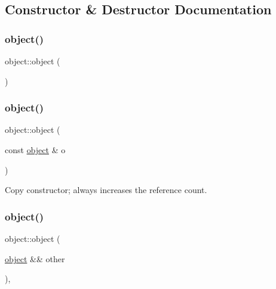 \subsection{Constructor \& Destructor Documentation}
\mbox{\label{classobject_a9ac91a751171ebf7e3af73720238818e}} 
\subsubsection{\texorpdfstring{object()}{object()}\hspace{0.1cm}{\footnotesize\ttfamily [1/5]}}
{\footnotesize\ttfamily object\+::object (\begin{DoxyParamCaption}{ }\end{DoxyParamCaption})\hspace{0.3cm}{\ttfamily [default]}}

\mbox{\label{classobject_a6537d8aee1fc94555af84e5bb9ecad21}} 
\subsubsection{\texorpdfstring{object()}{object()}\hspace{0.1cm}{\footnotesize\ttfamily [2/5]}}
{\footnotesize\ttfamily object\+::object (\begin{DoxyParamCaption}\item[{const \mbox{\hyperlink{classobject}{object}} \&}]{o }\end{DoxyParamCaption})\hspace{0.3cm}{\ttfamily [inline]}}



Copy constructor; always increases the reference count. 

\mbox{\label{classobject_a3fc437bccb86b745433164bc3a04a2a4}} 
\subsubsection{\texorpdfstring{object()}{object()}\hspace{0.1cm}{\footnotesize\ttfamily [3/5]}}
{\footnotesize\ttfamily object\+::object (\begin{DoxyParamCaption}\item[{\mbox{\hyperlink{classobject}{object}} \&\&}]{other }\end{DoxyParamCaption})\hspace{0.3cm}{\ttfamily [inline]}, {\ttfamily [noexcept]}}



